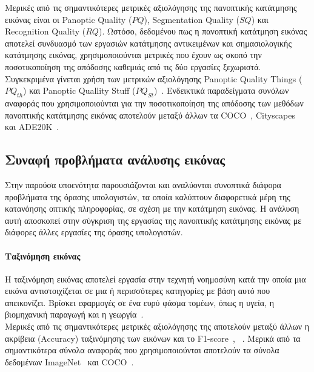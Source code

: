 \documentclass[12pt]{article}
\numberwithin{equation}{section}
\begin{document}
Μερικές από τις σημαντικότερες μετρικές αξιολόγησης της πανοπτικής κατάτμησης εικόνας είναι οι Panoptic Quality (\(PQ\)), Segmentation Quality (\(SQ\)) και Recognition Quality (\(RQ\)). Ωστόσο, δεδομένου πως η πανοπτική κατάτμηση εικόνας αποτελεί συνδυασμό των εργασιών κατάτμησης αντικειμένων και σημασιολογικής κατάτμησης εικόνας, χρησιμοποιούνται μετρικές που έχουν ως σκοπό την ποσοτικοποίηση της απόδοσης καθεμιάς από τις δύο εργασίες ξεχωριστά. Συγκεκριμένα γίνεται χρήση των μετρικών αξιολόγησης Panoptic Quality Things (\(PQ_{th}\)) και Panoptic Quallity Stuff (\(PQ_{St}\))~\cite{elharrouss2021panopticsegmentationreview}. Ενδεικτικά παραδείγματα συνόλων αναφοράς που χρησιμοποιούνται για την ποσοτικοποίηση της απόδοσης των μεθόδων πανοπτικής κατάτμησης εικόνας αποτελούν μεταξύ άλλων τα COCO~\cite{lin2015microsoftcococommonobjects}, Cityscapes~\cite{DBLP:journals/corr/CordtsORREBFRS16} και ADE20K~\cite{8100027}.\\

\subsection{Συναφή προβλήματα ανάλυσης εικόνας}

Στην παρούσα υποενότητα παρουσιάζονται και αναλύονται συνοπτικά διάφορα προβλήματα της όρασης υπολογιστών, τα οποία καλύπτουν διαφορετικά μέρη της κατανόησης οπτικής πληροφορίας, σε σχέση με την κατάτμηση εικόνας. Η ανάλυση αυτή αποσκοπεί στην σύγκριση της εργασίας της πανοπτικής κατάτμησης εικόνας με διάφορες άλλες εργασίες της όρασης υπολογιστών.\\ 

\paragraph{Ταξινόμηση εικόνας \\ [0.5 cm]} 

Η ταξινόμηση εικόνας αποτελεί εργασία στην τεχνητή νοημοσύνη κατά την οποία μια εικόνα αντιστοιχίζεται σε μια ή περισσότερες κατηγορίες με βάση αυτό που απεικονίζει. Βρίσκει εφαρμογές σε ένα ευρύ φάσμα τομέων, όπως η υγεία, η βιομηχανική παραγωγή και η γεωργία~\cite{onix_image_classification_2024}.\\

Μερικές από τις σημαντικότερες μετρικές αξιολόγησης της αποτελούν μεταξύ άλλων η ακρίβεια (Accuracy) ταξινόμησης των εικόνων και το F1-score~\cite{article10}, ~\cite{Rainio2024}. Μερικά από τα σημαντικότερα σύνολα αναφοράς που χρησιμοποιούνται αποτελούν τα σύνολα δεδομένων ImageNet~\cite{5206848} και COCO~\cite{lin2015microsoftcococommonobjects}.\\
\end{document}

